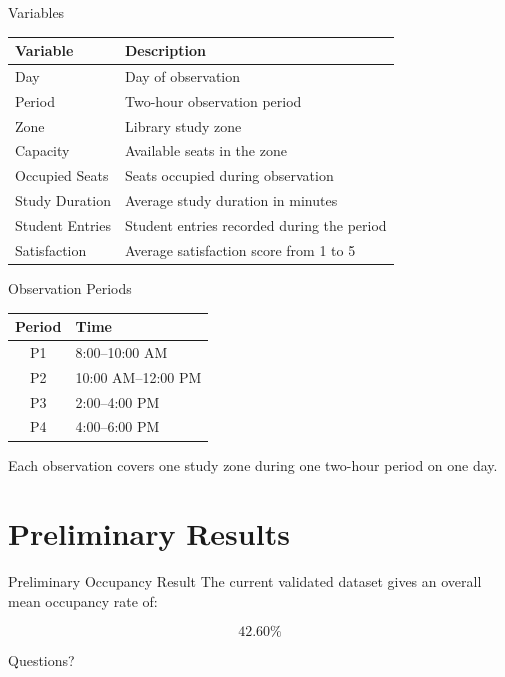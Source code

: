 \documentclass[aspectratio=169,11pt]{beamer}
\begin{document}
\begin{frame}{Variables}
    \begin{table}
        \centering
        \small
        \begin{tabular}{ll}
            \toprule
            \textbf{Variable} & \textbf{Description} \\
            \midrule
            Day & Day of observation \\
            Period & Two-hour observation period \\
            Zone & Library study zone \\
            Capacity & Available seats in the zone \\
            Occupied Seats & Seats occupied during observation \\
            Study Duration & Average study duration in minutes \\
            Student Entries & Student entries recorded during the period \\
            Satisfaction & Average satisfaction score from 1 to 5 \\
            \bottomrule
        \end{tabular}
    \end{table}
\end{frame}

\begin{frame}{Observation Periods}
    \begin{table}
        \centering
        \small
        \begin{tabular}{cl}
            \toprule
            \textbf{Period} & \textbf{Time} \\
            \midrule
            P1 & 8:00--10:00 AM \\
            P2 & 10:00 AM--12:00 PM \\
            P3 & 2:00--4:00 PM \\
            P4 & 4:00--6:00 PM \\
            \bottomrule
        \end{tabular}
    \end{table}

    \vspace{0.3cm}

    Each observation covers one study zone during one two-hour period
    on one day.
\end{frame}

\section{Preliminary Results}

\begin{frame}{Preliminary Occupancy Result}
    The current validated dataset gives an overall mean occupancy rate of:

    \[
    \boxed{42.60\%}
    \]
\end{frame}

\begin{frame}
    \centering
    \Huge Questions?
\end{frame}
\end{document}
